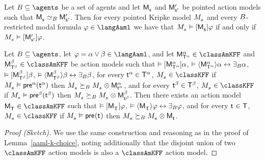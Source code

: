 \begin{corollary}
Let $\agentsB \subseteq \agents$ be a set of agents and let $\aPModel{\aStateS}$ and $\aPModelP{\aStateSP}$ be pointed action models such that $\aPModel{\aStateS} \bisimilar[\agentsB] \aPModelP{\aStateSP}$.
Then for every pointed Kripke model $\kPModel{\kStateS}$ and every $\agentsB$-restricted modal formula $\phi \in \langAaml$ we have that $\kPModel{\kStateS} \entails \actionA{\aPModel{\aStateS}} \phi$ if and only if $\kPModel{\kStateS} \entails \actionA{\aPModelP{\aStateSP}} \phi$.
\end{corollary}

\begin{lemma}\label{aaml-kff-choice}
Let $\agentsB \subseteq \agents$, 
let $\phi = \alpha \lor \beta \in \langAaml$, and 
let $\aPModel[\alpha]{\aStatesT[\alpha]} \in \classAmKFF$ and $\aPModel[\beta]{\aStatesT[\beta]} \in \classAmKFF$ be action models such that 
$\entails \actionA{\aPModel[\alpha]{\aStatesT[\alpha]}} \alpha$, 
$\entails \actionE{\aPModel[\alpha]{\aStatesT[\alpha]}} \alpha \iff \someactsBs \alpha$, 
$\entails \actionA{\aPModel[\beta]{\aStatesT[\beta]}} \beta$,
$\entails \actionE{\aPModel[\beta]{\aStatesT[\beta]}} \beta \iff \someactsBs \beta$,
for every $\aStateT[\alpha] \in \aStatesT[\alpha]$, $\kPModel{\kStateS} \in \classKFF$ if $\kPModel{\kStateS} \entails \aPrecondition[\alpha](\aStateT[\alpha])$ then $\kPModel{\kStateS} \simulatesBs \kPModel{\kStateS} \exec \aPModel[\alpha]{\aStateT[\alpha]}$, and
for every $\aStateT[\beta] \in \aStatesT[\beta]$, $\kPModel{\kStateS} \in \classKFF$ if $\kPModel{\kStateS} \entails \aPrecondition[\beta](\aStateT[\beta])$ then $\kPModel{\kStateS} \simulatesBs \kPModel{\kStateS} \exec \aPModel[\beta]{\aStateT[\beta]}$.
Then there exists an action model $\aPModel{\aStatesT} \in \classAmKFF$ such that 
$\entails \actionA{\aPModel{\aStatesT}} \phi$,
$\entails \actionE{\aPModel{\aStatesT}} \phi \iff \someactsBs \phi$, and
for every $\aStateT \in \aStatesT$, $\kPModel{\kStateS} \in \classKFF$ if $\kPModel{\kStateS} \entails \aPrecondition(\aStateT)$ then $\kPModel{\kStateS} \simulatesBs \kPModel{\kStateS} \exec \aPModel{\aStateT}$.
\end{lemma}

\begin{proof}[Proof (Sketch)]
We use the same construction and reasoning as in the proof of Lemma~\ref{aaml-k-choice}, noting additionally that the disjoint union of two $\classAmKFF$ action models is also a $\classAmKFF$ action model.
\end{proof}

